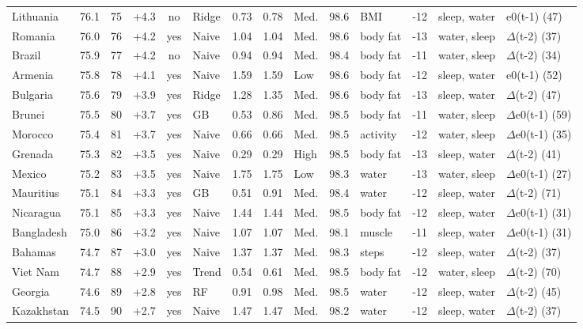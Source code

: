 {\begin{longtable}{l r r r c l r r l r l r l l}
Lithuania & 76.1 & 75 & +4.3 & no & Ridge & 0.73 & 0.78 & Med. & 98.6 & BMI & -12 & sleep, water & e0(t-1) (47) \\
Romania & 76.0 & 76 & +4.2 & yes & Naive & 1.04 & 1.04 & Med. & 98.6 & body fat & -13 & water, sleep & $\Delta$(t-2) (37) \\
Brazil & 75.9 & 77 & +4.2 & no & Naive & 0.94 & 0.94 & Med. & 98.4 & body fat & -11 & water, sleep & $\Delta$(t-2) (34) \\
Armenia & 75.8 & 78 & +4.1 & yes & Naive & 1.59 & 1.59 & Low & 98.6 & body fat & -12 & sleep, water & e0(t-1) (52) \\
Bulgaria & 75.6 & 79 & +3.9 & yes & Ridge & 1.28 & 1.35 & Med. & 98.6 & body fat & -13 & sleep, water & $\Delta$(t-2) (47) \\
Brunei & 75.5 & 80 & +3.7 & yes & GB & 0.53 & 0.86 & Med. & 98.5 & body fat & -11 & water, sleep & $\Delta$e0(t-1) (59) \\
Morocco & 75.4 & 81 & +3.7 & yes & Naive & 0.66 & 0.66 & Med. & 98.5 & activity & -12 & water, sleep & $\Delta$e0(t-1) (35) \\
Grenada & 75.3 & 82 & +3.5 & yes & Naive & 0.29 & 0.29 & High & 98.5 & body fat & -13 & sleep, water & $\Delta$(t-2) (41) \\
Mexico & 75.2 & 83 & +3.5 & yes & Naive & 1.75 & 1.75 & Low & 98.3 & water & -13 & water, sleep & $\Delta$e0(t-1) (27) \\
Mauritius & 75.1 & 84 & +3.3 & yes & GB & 0.51 & 0.91 & Med. & 98.4 & water & -12 & sleep, water & $\Delta$(t-2) (71) \\
Nicaragua & 75.1 & 85 & +3.3 & yes & Naive & 1.44 & 1.44 & Med. & 98.5 & body fat & -12 & sleep, water & $\Delta$e0(t-1) (31) \\
Bangladesh & 75.0 & 86 & +3.2 & yes & Naive & 1.07 & 1.07 & Med. & 98.1 & muscle & -11 & sleep, water & $\Delta$e0(t-1) (31) \\
Bahamas & 74.7 & 87 & +3.0 & yes & Naive & 1.37 & 1.37 & Med. & 98.3 & steps & -12 & sleep, water & $\Delta$(t-2) (37) \\
Viet Nam & 74.7 & 88 & +2.9 & yes & Trend & 0.54 & 0.61 & Med. & 98.5 & body fat & -12 & water, sleep & $\Delta$(t-2) (70) \\
Georgia & 74.6 & 89 & +2.8 & yes & RF & 0.91 & 0.98 & Med. & 98.5 & water & -12 & sleep, water & $\Delta$(t-2) (45) \\
Kazakhstan & 74.5 & 90 & +2.7 & yes & Naive & 1.47 & 1.47 & Med. & 98.2 & water & -12 & sleep, water & $\Delta$(t-2) (37) \\

\end{longtable}}
